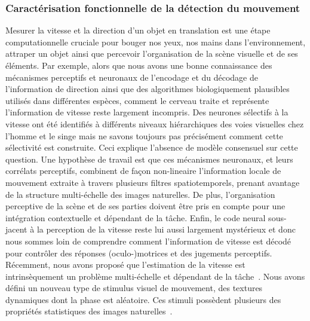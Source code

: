 \subsubsection{Caractérisation fonctionnelle de la détection du mouvement~\citep{Vacher16,Ravello19}}%
\label{sec:motionclouds}
Mesurer la vitesse et la direction d'un objet en translation est une étape computationnelle cruciale pour bouger nos yeux, nos mains dans l'environnement, attraper un objet ainsi que percevoir l'organisation de la scène visuelle et de ses éléments. Par exemple, alors que nous avons une bonne connaissance des mécanismes perceptifs et neuronaux de l'encodage et du décodage de l'information de direction ainsi que des algorithmes biologiquement plausibles utilisés dans différentes espèces, comment le cerveau traite et représente l'information de vitesse reste largement incompris. Des neurones sélectifs à la vitesse ont été identifiés à différents niveaux hiérarchiques des voies visuelles chez l'homme et le singe mais ne savons toujours pas précisément comment cette sélectivité est construite. Ceci explique l'absence de modèle consensuel sur cette question. Une hypothèse de travail est que ces mécanismes neuronaux, et leurs corrélats perceptifs, combinent de façon non-lineaire l'information locale de mouvement extraite à travers plusieurs filtres spatiotemporels, prenant avantage de la structure multi-échelle des images naturelles. De plus, l'organisation perceptive de la scène et de ses parties doivent être pris en compte pour une intégration contextuelle et dépendant de la tâche. Enfin, le code neural sous-jacent à la perception de la vitesse reste lui aussi largement mystérieux et donc nous sommes loin de comprendre comment l'information de vitesse est décodé pour contrôler des réponses (oculo-)motrices et des jugements perceptifs. Récemment, nous avons proposé que l'estimation de la vitesse est intrinsèquement un problème multi-échelle et dépendant de la tâche~\citep{Simoncini12}. Nous avons défini un nouveau type de stimulus visuel de mouvement, des textures dynamiques dont la phase est aléatoire. Ces stimuli possèdent plusieurs des propriétés statistiques des images naturelles~\citep{Sanz12,Vacher15nips}.


